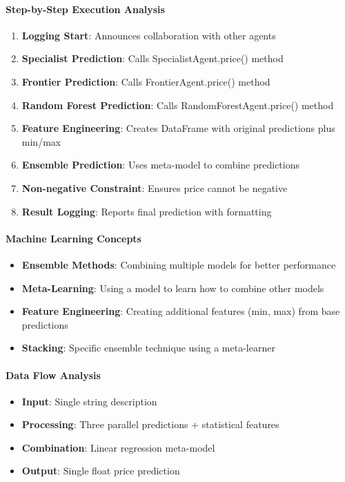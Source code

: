 \paragraph{Step-by-Step Execution Analysis}
\begin{enumerate}
\item \textbf{Logging Start}: Announces collaboration with other agents
\item \textbf{Specialist Prediction}: Calls SpecialistAgent.price() method
\item \textbf{Frontier Prediction}: Calls FrontierAgent.price() method  
\item \textbf{Random Forest Prediction}: Calls RandomForestAgent.price() method
\item \textbf{Feature Engineering}: Creates DataFrame with original predictions plus min/max
\item \textbf{Ensemble Prediction}: Uses meta-model to combine predictions
\item \textbf{Non-negative Constraint}: Ensures price cannot be negative
\item \textbf{Result Logging}: Reports final prediction with formatting
\end{enumerate}

\paragraph{Machine Learning Concepts}
\begin{itemize}
\item \textbf{Ensemble Methods}: Combining multiple models for better performance
\item \textbf{Meta-Learning}: Using a model to learn how to combine other models
\item \textbf{Feature Engineering}: Creating additional features (min, max) from base predictions
\item \textbf{Stacking}: Specific ensemble technique using a meta-learner
\end{itemize}

\paragraph{Data Flow Analysis}
\begin{itemize}
\item \textbf{Input}: Single string description
\item \textbf{Processing}: Three parallel predictions + statistical features
\item \textbf{Combination}: Linear regression meta-model
\item \textbf{Output}: Single float price prediction
\end{itemize}

